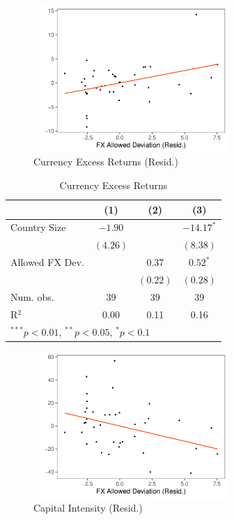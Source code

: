 \documentclass[12pt,english,round]{article}
\begin{document}
\begin{figure}[htp!]
    \centering
    \caption{Currency Excess Returns (Resid.)}
    \includegraphics[width=0.66\textwidth]{Figure_RX_ERA.pdf}
\end{figure}

\vspace{1em}


\begin{table}[htp]
\begin{center}
\caption{Currency Excess Returns}
\begin{tabular}{l c c c }
\hline
 & (1) & (2) & (3) \\
\hline
Country Size            & $-1.90$      &          & $-14.17^{*}$ \\
                        & $(4.26)$     &          & $(8.38)$     \\
Allowed FX Dev.         &              & $0.37$   & $0.52^{*}$   \\
                        &              & $(0.22)$ & $(0.28)$     \\
\hline
Num. obs.               & 39           & 39       & 39           \\
R$^2$                   & 0.00         & 0.11     & 0.16         \\
\hline
\multicolumn{4}{l}{\scriptsize{$^{***}p<0.01$, $^{**}p<0.05$, $^*p<0.1$}}
\end{tabular}
\end{center}
\end{table}

\clearpage

\begin{figure}[htp!]
    \centering
    \caption{Capital Intensity (Resid.)}
    \includegraphics[width=0.66\textwidth]{Figure_KY_ERA.pdf}
\end{figure}
\end{document}
